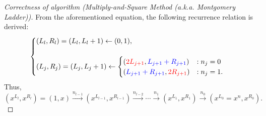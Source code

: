 \documentclass[12pt,openany]{book}
\theoremstyle{definition}
\begin{document}
\begin{proof}[Correctness of algorithm \textnormal{(Multiply-and-Square Method (a.k.a. Montgomery Ladder))}]
		From the aforementioned equation, the following recurrence relation is derived: \[
		\begin{cases}
			(L_l,R_l)=(L_l,L_l+1)\leftarrow (0,1),\\\\
			(L_j,R_j)=(L_j,L_j+1)\leftarrow\begin{cases}
				(\textcolor{red}{2L_{j+1}},\textcolor{blue}{L_{j+1}+R_{j+1}}) &: n_j=0\\
				(\textcolor{blue}{L_{j+1}+R_{j+1}},\textcolor{red}{2R_{j+1}}) &: n_j=1.
			\end{cases}
		\end{cases}
		\]
		Thus, \[
		(x^{L_l},x^{R_l})=(1,x)\xrightarrow{n_{l-1}}(x^{L_{l-1}},x^{R_{l-1}})\xrightarrow{n_{l-2}}\cdots\xrightarrow{n_{1}}(x^{L_1},x^{R_1})\xrightarrow{n_0}(x^{L_0}=x^n,x^{R_0}).
		\]
	\end{proof}
	\vspace{8pt}
\end{document}

